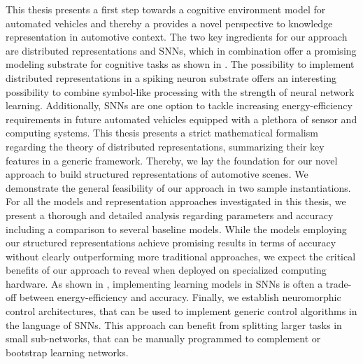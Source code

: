 This thesis presents a first step towards a cognitive environment model for automated vehicles and thereby a provides a novel perspective to knowledge representation in automotive context.
The two key ingredients for our approach are distributed representations and \acp{SNN}, which in combination offer a promising modeling substrate for cognitive tasks as shown in \cite{Eliasmith2013, Eliasmith2012}. 
The possibility to implement distributed representations in a spiking neuron substrate offers an interesting possibility to combine symbol-like processing with the strength of neural network learning.
Additionally, \acp{SNN} are one option to tackle increasing energy-efficiency requirements in future automated vehicles equipped with a plethora of sensor and computing systems.
This thesis presents a strict mathematical formalism regarding the theory of distributed representations, summarizing their key features in a generic framework.
Thereby, we lay the foundation for our novel approach to build structured representations of automotive scenes.
We demonstrate the general feasibility of our approach in two sample instantiations.
For all the models and representation approaches investigated in this thesis, we present a thorough and detailed analysis regarding parameters and accuracy including a comparison to several baseline models.
While the models employing our structured representations achieve promising results in terms of accuracy without clearly outperforming more traditional approaches, we expect the critical benefits of our approach to reveal when deployed on specialized computing hardware. 
As shown in \cite{Hunsberger2016}, implementing learning models in \acp{SNN} is often a trade-off between energy-efficiency and accuracy.
Finally, we establish neuromorphic control architectures, that can be used to implement generic control algorithms in the language of \acp{SNN}.
This approach can benefit from splitting larger tasks in small sub-networks, that can be manually programmed to complement or bootstrap learning networks.

